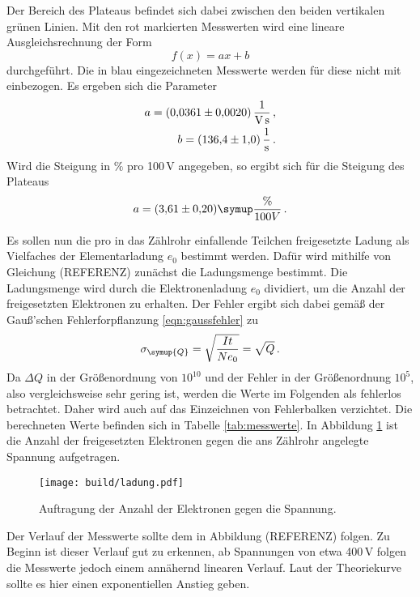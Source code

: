 Der Bereich des Plateaus befindet sich dabei zwischen den
beiden vertikalen grünen Linien. Mit den rot markierten Messwerten wird eine lineare
Ausgleichsrechnung der Form
\begin{equation}
  f(x)=ax+b
\end{equation}
durchgeführt. Die in blau eingezeichneten Messwerte werden für diese nicht mit
einbezogen. Es ergeben sich die Parameter
\begin{align*}
  a = (0{,}0361 \pm 0{,}0020)\, \frac{1}{\text{V\,s}} \,,\\
  b = (136{,}4 \pm 1{,}0)\,\frac{1}{\text{s}} \,.
\end{align*}
Wird die Steigung in $\%$ pro 100\,V angegeben, so ergibt sich für die Steigung des
Plateaus
\begin{equation*}
  a=(3{,}61 \pm 0{,}20) \symup{\frac{\%}{100V}} \,.  %
\end{equation*}





Es sollen nun die pro in das Zählrohr einfallende Teilchen freigesetzte Ladung
als Vielfaches der Elementarladung $e_0$ bestimmt werden. Dafür wird mithilfe von
Gleichung (REFERENZ) zunächst die Ladungsmenge bestimmt. Die Ladungsmenge wird durch die
Elektronenladung $e_0$ dividiert, um die Anzahl der freigesetzten Elektronen
zu erhalten. Der Fehler ergibt sich dabei
gemäß der Gauß'schen Fehlerforpflanzung \eqref{eqn:gaussfehler} zu
\begin{equation*}
  \sigma_{\symup{Q}}=\sqrt{\frac{I t}{N e_0}}=\sqrt{Q} \,.
\end{equation*}
Da $\Delta Q$ in der Größenordnung von $10^{10}$ und der Fehler in der
Größenordnung $10^{5}$, also vergleichsweise sehr gering ist, werden die
Werte im Folgenden als fehlerlos betrachtet. Daher wird auch auf das Einzeichnen von
Fehlerbalken verzichtet. Die berechneten Werte
befinden sich in Tabelle \ref{tab:messwerte}.
In Abbildung \ref{fig:ladung} ist die Anzahl der freigesetzten Elektronen
gegen die ans Zählrohr angelegte Spannung aufgetragen.

\begin{figure}
  \centering
  \texttt{[image: build/ladung.pdf]}
  \caption{Auftragung der Anzahl der Elektronen gegen die Spannung.}
  \label{fig:ladung}
\end{figure}

Der Verlauf der Messwerte sollte dem in Abbildung (REFERENZ) folgen. Zu Beginn ist
dieser Verlauf gut zu erkennen, ab Spannungen von etwa 400\,V folgen die Messwerte
jedoch einem annähernd linearen Verlauf. Laut der Theoriekurve sollte es hier
einen exponentiellen Anstieg geben.

